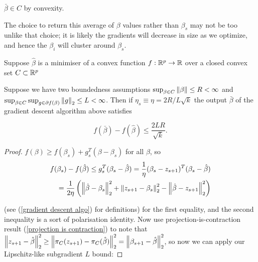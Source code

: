 \documentclass[11pt]{scrartcl}
\begin{document}
\begin{remark}$\bar{\beta} \in C$ by convexity.
\end{remark} %

\begin{remark}The choice to return this average of $\beta$ values rather than $\beta_s$ may not be too unlike that choice; it is likely the gradients will decrease in size as we optimize, and hence the $\beta_i$ will cluster around $\beta_s$.\end{remark}

\begin{theorem}
\label{maths with gradient descent algo}
Suppose $\hat{\beta}$ is a minimiser of a convex function $f:\mathbb R^p \rightarrow \mathbb R$ over a closed convex set $C \subset \mathbb R^p$ %

Suppose we have two boundedness assumptions $\sup_{\beta \in C} \left\lVert\beta\right\rVert \le R < \infty$ and $\sup_{\beta \in C} \sup_{g \in \partial f(\beta)} \left\lVert g\right\rVert_2 \le L < \infty$. Then if $\eta_s \equiv \eta = 2R / L\sqrt{k}$ the output $\bar{\beta}$ of the gradient descent algorithm above satisfies

\begin{equation}
    f(\bar{\beta}) - f(\hat{\beta}) \le \frac{2LR}{\sqrt{k}}.
\label{our classic bounding thing for grad descent algo}
\end{equation}

\begin{proof}
$f(\beta) \ge f(\beta_s) + g_s^T(\beta-\beta_s)$ for all $\beta$, so 
\begin{align}
f(\beta_s) - f(\hat{\beta}) \le g_s^T (\beta_s - \hat{\beta}) = \frac{1}{\eta} (\beta_s - z_{s+1})^T (\beta_s - \hat{\beta}) \\
= \frac{1}{2\eta} \left (\left\lVert\hat{\beta} - \beta_s\right\rVert_2^2 + \left\lVert z_{s+1}-\beta_s\right\rVert_2^2 - \left\lVert\hat{\beta} - z_{s+1}\right\rVert_2^2 \right) \\
\end{align}

(see (\ref{gradient descent algo}) for definitions) for the first equality, and the second inequality is a sort of polarisation identity. Now use projection-is-contraction result (\ref{projection is contraction}) to note that $\left\lVert z_{s+1} - \hat{\beta}\right\rVert_2^2 \ge \left\lVert\pi_C(z_{s+1}) - \pi_C( \hat{ \beta })\right\rVert_2^2  = \left\lVert\beta_{s+1} - \hat{\beta}\right\rVert_2^2$, so now we can apply our Lipschitz-like subgradient $L$ bound:


\end{proof}
\end{theorem}
\end{document}
